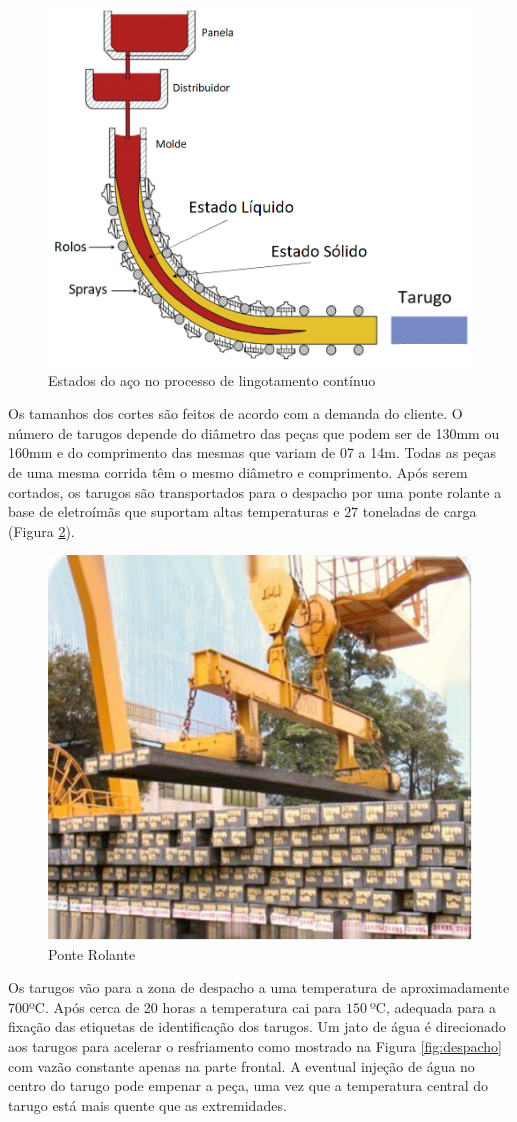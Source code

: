 \begin{figure}[H]
	\centering
	\includegraphics[width=0.6\linewidth]{figuras/Steel/estadoSolidoLiq.png}
	\caption{Estados do aço no processo de lingotamento contínuo}
	\label{fig:processLingSolid}
\end{figure}

Os tamanhos dos cortes são feitos de acordo com a demanda do cliente. O número de tarugos depende do diâmetro das peças que podem ser de 130mm ou 160mm e do comprimento das mesmas que variam de 07 a 14m. Todas as peças de uma mesma corrida têm o mesmo diâmetro e comprimento. Após serem cortados, os tarugos são transportados para o despacho por uma ponte rolante a base de eletroímãs que suportam altas temperaturas e $27$ toneladas de carga (Figura \ref{fig:crane}). 

\begin{figure}[H]
	\centering
	\includegraphics[width=0.5\linewidth]{figuras/Steel/ponte_rolante.png}
	\caption{Ponte Rolante}
	\label{fig:crane}
\end{figure}

Os tarugos vão para a zona de despacho a uma temperatura de aproximadamente 700ºC.
%
Após cerca de 20 horas a temperatura cai para $150~$ºC, adequada para a fixação das etiquetas de identificação dos tarugos.
%
Um jato de água é direcionado aos tarugos para acelerar o resfriamento como mostrado na Figura \ref{fig:despacho} com vazão constante apenas na parte frontal.
%
A eventual injeção de água no centro do tarugo pode empenar a peça, uma vez que a temperatura central do tarugo está mais quente que as extremidades.

